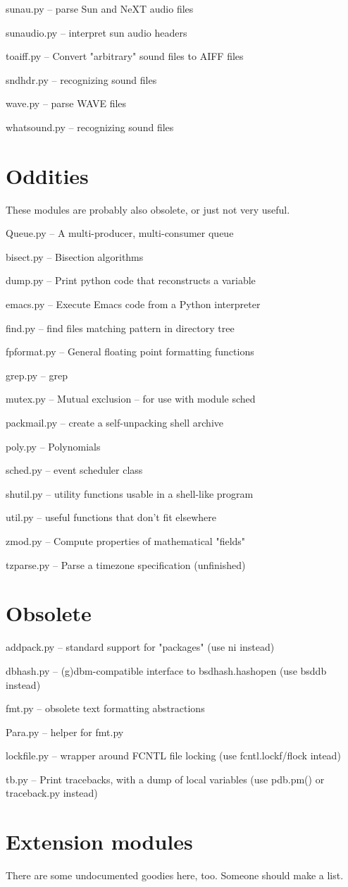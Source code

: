 sunau.py -- parse Sun and NeXT audio files

sunaudio.py -- interpret sun audio headers

toaiff.py -- Convert "arbitrary" sound files to AIFF files

sndhdr.py -- recognizing sound files

wave.py -- parse WAVE files

whatsound.py -- recognizing sound files


\section{Oddities}

These modules are probably also obsolete, or just not very useful.

Queue.py -- A multi-producer, multi-consumer queue

bisect.py -- Bisection algorithms

dump.py -- Print python code that reconstructs a variable

emacs.py -- Execute Emacs code from a Python interpreter

find.py -- find files matching pattern in directory tree

fpformat.py -- General floating point formatting functions

grep.py -- grep

mutex.py -- Mutual exclusion -- for use with module sched

packmail.py -- create a self-unpacking shell archive

poly.py -- Polynomials

sched.py -- event scheduler class

shutil.py -- utility functions usable in a shell-like program

util.py -- useful functions that don't fit elsewhere

zmod.py -- Compute properties of mathematical "fields"

tzparse.py -- Parse a timezone specification (unfinished)


\section{Obsolete}

addpack.py -- standard support for "packages" (use ni instead)

dbhash.py -- (g)dbm-compatible interface to bsdhash.hashopen (use
bsddb instead)

fmt.py -- obsolete text formatting abstractions

Para.py -- helper for fmt.py

lockfile.py -- wrapper around FCNTL file locking (use
fcntl.lockf/flock intead)

tb.py -- Print tracebacks, with a dump of local variables (use
pdb.pm() or traceback.py instead)


\section{Extension modules}

There are some undocumented goodies here, too.  Someone should make a
list.
